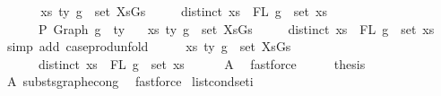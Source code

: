 \begin{isabellebody}
%
\isadelimproof
%
\endisadelimproof
%
\isatagproof
{}\isamarkupfalse%
\ {\isacharminus}{\kern0pt}\isanewline
\ \ \isamarkupfalse%
\isanewline
\ \ {\isachardoublequoteopen}{\isasymforall}{\isacharparenleft}{\kern0pt}{\isacharparenleft}{\kern0pt}xs{\isacharcomma}{\kern0pt}\ ty{\isacharparenright}{\kern0pt}{\isacharcomma}{\kern0pt}\ g{\isacharparenright}{\kern0pt}\ {\isasymin}\ set\ XsGs{\isachardot}{\kern0pt}\isanewline
\ \ \ \ \ distinct\ xs\ {\isasymand}\ FL\ g\ {\isacharequal}{\kern0pt}\ set\ xs\ {\isasymand}\isanewline
\ \ \ \ \ {\isacharbrackleft}{\kern0pt}{\isacharbrackright}{\kern0pt}\ {\isasymturnstile}{\isacharbraceleft}{\kern0pt}P{\isacharbraceright}{\kern0pt}\ Graph\ g\ {\isacharcolon}{\kern0pt}\ ty\ {\isacharequal}{\kern0pt}{\isacharequal}{\kern0pt}{\isachargreater}{\kern0pt}\isanewline
\ \ {\isasymforall}{\isacharparenleft}{\kern0pt}{\isacharparenleft}{\kern0pt}xs{\isacharcomma}{\kern0pt}\ ty{\isacharparenright}{\kern0pt}{\isacharcomma}{\kern0pt}\ g{\isacharparenright}{\kern0pt}\ {\isasymin}\ set\ XsGs{\isachardot}{\kern0pt}\isanewline
\ \ \ \ \ distinct\ xs\ {\isasymand}\ FL\ g\ {\isacharequal}{\kern0pt}\ set\ xs{\isachardoublequoteclose}\isanewline
\ \ \isamarkupfalse%
\ {\isacharparenleft}{\kern0pt}simp\ add{\isacharcolon}{\kern0pt}\ case{\isacharunderscore}{\kern0pt}prod{\isacharunderscore}{\kern0pt}unfold{\isacharparenright}{\kern0pt}\isanewline
\ \ \isamarkupfalse%
\ \isamarkupfalse%
\ {\isachardoublequoteopen}{\isasymforall}{\isacharparenleft}{\kern0pt}{\isacharparenleft}{\kern0pt}xs{\isacharcomma}{\kern0pt}\ ty{\isacharparenright}{\kern0pt}{\isacharcomma}{\kern0pt}\ g{\isacharparenright}{\kern0pt}\ {\isasymin}\ set\ XsGs{\isachardot}{\kern0pt}\isanewline
\ \ \ \ \ \ distinct\ xs\ {\isasymand}\ FL\ g\ {\isacharequal}{\kern0pt}\ set\ xs{\isachardoublequoteclose}\isanewline
\ \ \ \ \isamarkupfalse%
\ A{}\ \isamarkupfalse%
\ fastforce\isanewline
\ \ \isamarkupfalse%
\ \isamarkupfalse%
\ {\isacharquery}{\kern0pt}thesis\isanewline
\ \ \ \ \isamarkupfalse%
\ A{}\ substs{\isacharunderscore}{\kern0pt}graph{\isacharunderscore}{\kern0pt}econg{}\ \isamarkupfalse%
\ fastforce\isanewline
{}\isamarkupfalse%
%
\endisatagproof
{\isafoldproof}%
%
\isadelimproof
\isanewline
%
\endisadelimproof
\isanewline
\isanewline
\isanewline
{}\isamarkupfalse%
\ list{\isacharunderscore}{\kern0pt}cond{\isacharunderscore}{\kern0pt}set{\isacharunderscore}{\kern0pt}i{\isacharcolon}{\kern0pt}\isanewline

\end{isabellebody}
